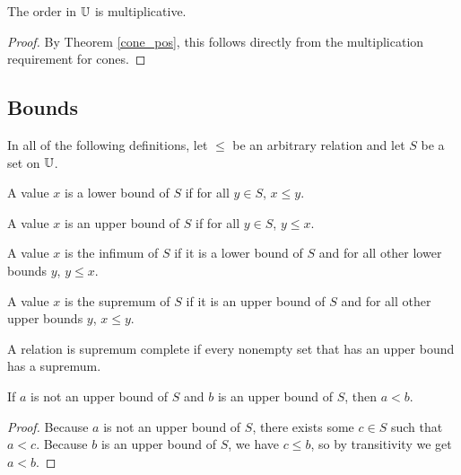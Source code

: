 \documentclass[../../math.tex]{subfiles}
\begin{document}
\begin{instance}
    The order in $\mathbb{U}$ is multiplicative.
\end{instance}
\begin{proof}
    By Theorem \ref{cone_pos}, this follows directly from the multiplication
    requirement for cones.
\end{proof}

\subsection{Bounds}

In all of the following definitions, let $\leq$ be an arbitrary relation and let
$S$ be a set on $\mathbb{U}$.

\begin{definition}
    A value $x$ is a lower bound of $S$ if for all $y \in S$, $x \leq y$.
\end{definition}

\begin{definition}
    A value $x$ is an upper bound of $S$ if for all $y \in S$, $y \leq x$.
\end{definition}

\begin{definition}
    A value $x$ is the infimum of $S$ if it is a lower bound of $S$ and for all
    other lower bounds $y$, $y \leq x$.
\end{definition}

\begin{definition}
    A value $x$ is the supremum of $S$ if it is an upper bound of $S$ and for
    all other upper bounds $y$, $x \leq y$.
\end{definition}

\begin{class}
    A relation is supremum complete if every nonempty set that has an upper
    bound has a supremum.
\end{class}

\begin{theorem} \label{upper_bound_leq}
    If $a$ is not an upper bound of $S$ and $b$ is an upper bound of $S$, then
    $a < b$.
\end{theorem}
\begin{proof}
    Because $a$ is not an upper bound of $S$, there exists some $c \in S$ such
    that $a < c$.  Because $b$ is an upper bound of $S$, we have $c \leq b$, so
    by transitivity we get $a < b$.
\end{proof}
\end{document}
